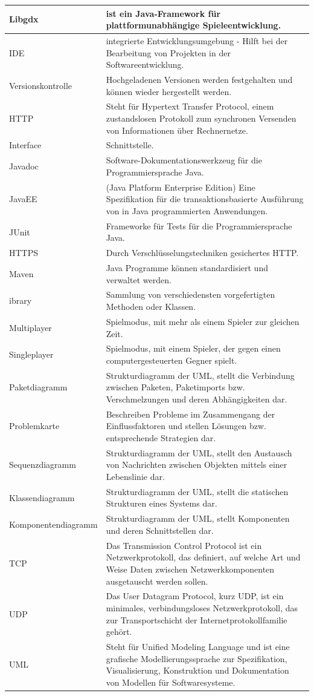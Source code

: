 \documentclass[fontsize=12pt,paper=a4,twoside]{scrartcl}
\begin{document}
\begin{longtable}{ |  l | p{12cm} |}
    Libgdx & ist ein Java-Framework für plattformunabhängige Spieleentwicklung. \\
    \hline
IDE & integrierte Entwicklungsumgebung - Hilft bei der Bearbeitung von Projekten
in der Softwareentwicklung. \\     \hline
Versionskontrolle  &Hochgeladenen Versionen werden festgehalten und können
wieder hergestellt werden. \\     \hline
HTTP &Steht für Hypertext Transfer Protocol, einem zustandslosen
Protokoll zum synchronen Versenden von
Informationen über Rechnernetze.\\ \hline
Interface &Schnittstelle.\\     \hline
Javadoc  &Software-Dokumentationswerkzeug für die Programmiersprache Java. \\     \hline
JavaEE &(Java Platform Enterprise Edition) Eine Spezifikation für die transaktionsbasierte 
Ausführung von in Java programmierten Anwendungen.\\    \hline
JUnit & Frameworke für Tests für die Programmiersprache Java.\\     \hline
HTTPS &Durch Verschlüsselungstechniken gesichertes HTTP. \\ \hline
Maven  &Java Programme können standardisiert und verwaltet werden.\\     \hline
 ibrary &Sammlung von verschiedensten vorgefertigten Methoden oder Klassen.\\     \hline
Multiplayer &Spielmodus, mit mehr als einem Spieler zur gleichen Zeit.\\    \hline
Singleplayer &Spielmodus, mit einem Spieler, der gegen einen computergesteuerten
Gegner spielt. \\     \hline
Paketdiagramm &Strukturdiagramm der UML, stellt die Verbindung
zwischen Paketen, Paketimports bzw. Verschmelzungen
und deren Abhängigkeiten dar. \\ \hline
Problemkarte &Beschreiben Probleme im Zusammengang der Einflussfaktoren
und stellen Lösungen bzw. entsprechende
Strategien dar. \\ \hline
Sequenzdiagramm &Strukturdiagramm der UML, stellt den Austausch
von Nachrichten zwischen Objekten mittels einer Lebenslinie
dar. \\ \hline
Klassendiagramm &Strukturdiagramm der UML, stellt die statischen
Strukturen eines Systems dar.\\ \hline
Komponentendiagramm &Strukturdiagramm der UML, stellt Komponenten
und deren Schnittstellen dar. \\ \hline
TCP &Das Transmission Control Protocol ist ein Netzwerkprotokoll, das definiert, auf welche Art und Weise
 Daten zwischen Netzwerkkomponenten ausgetauscht werden sollen. \\ \hline
UDP &Das User Datagram Protocol, kurz UDP, ist ein minimales, verbindungsloses Netzwerkprotokoll, 
das zur Transportschicht der Internetprotokollfamilie gehört.\\ \hline
  UML &Steht für Unified Modeling Language und ist eine grafische
Modellierungssprache zur Spezifikation, Visualisierung,
Konstruktion und Dokumentation von Modellen
für Softwaresysteme. \\
    \hline
   


\end{longtable}
\end{document}
